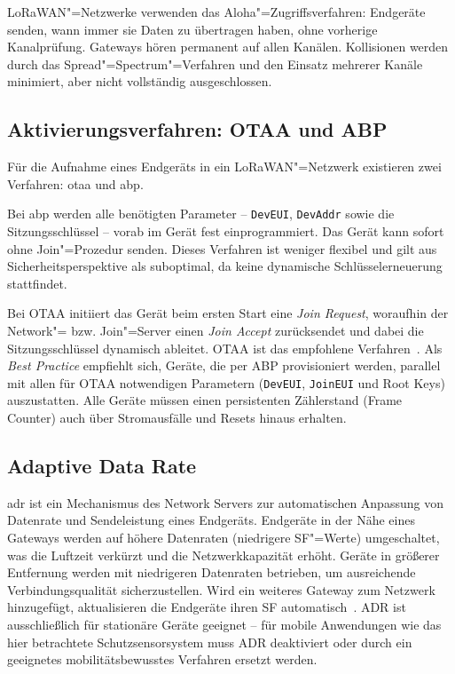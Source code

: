 LoRaWAN"=Netzwerke verwenden das Aloha"=Zugriffsverfahren: Endgeräte senden, wann
immer sie Daten zu übertragen haben, ohne vorherige Kanalprüfung. Gateways hören
permanent auf allen Kanälen. Kollisionen werden durch das Spread"=Spectrum"=Verfahren
und den Einsatz mehrerer Kanäle minimiert, aber nicht vollständig ausgeschlossen.

\subsection{Aktivierungsverfahren: OTAA und ABP}
\label{subsec:aktivierung}

Für die Aufnahme eines Endgeräts in ein LoRaWAN"=Netzwerk existieren zwei Verfahren:
\acrlong{otaa} und \acrlong{abp}.

Bei \acrshort{abp} werden alle benötigten Parameter -- \texttt{DevEUI}, \texttt{DevAddr}
sowie die Sitzungsschlüssel -- vorab im Gerät fest einprogrammiert. Das Gerät kann
sofort ohne Join"=Prozedur senden. Dieses Verfahren ist weniger flexibel und gilt aus
Sicherheitsperspektive als suboptimal, da keine dynamische Schlüsselerneuerung
stattfindet.

Bei OTAA initiiert das Gerät beim ersten Start eine \textit{Join Request},
woraufhin der Network"= bzw. Join"=Server einen \textit{Join Accept} zurücksendet
und dabei die Sitzungsschlüssel dynamisch ableitet. OTAA ist das empfohlene
Verfahren~\cite{lorawan_spec}. Als \textit{Best Practice} empfiehlt sich, Geräte,
die per ABP provisioniert werden, parallel mit allen für OTAA notwendigen Parametern
(\texttt{DevEUI}, \texttt{JoinEUI} und Root Keys) auszustatten. Alle Geräte müssen
einen persistenten Zählerstand (Frame Counter) auch über Stromausfälle und Resets
hinaus erhalten.

\subsection{Adaptive Data Rate}
\label{subsec:adr}

\acrlong{adr} ist ein Mechanismus des Network Servers zur automatischen Anpassung von
Datenrate und Sendeleistung eines Endgeräts. Endgeräte in der Nähe eines Gateways
werden auf höhere Datenraten (niedrigere SF"=Werte) umgeschaltet, was die Luftzeit
verkürzt und die Netzwerkkapazität erhöht. Geräte in größerer Entfernung werden mit
niedrigeren Datenraten betrieben, um ausreichende Verbindungsqualität sicherzustellen.
Wird ein weiteres Gateway zum Netzwerk hinzugefügt, aktualisieren die Endgeräte ihren
SF automatisch~\cite{semtech_lora_basics}. ADR ist ausschließlich für stationäre
Geräte geeignet -- für mobile Anwendungen wie das hier betrachtete Schutzsensorsystem %
muss ADR deaktiviert oder durch ein geeignetes mobilitätsbewusstes Verfahren ersetzt
werden.

